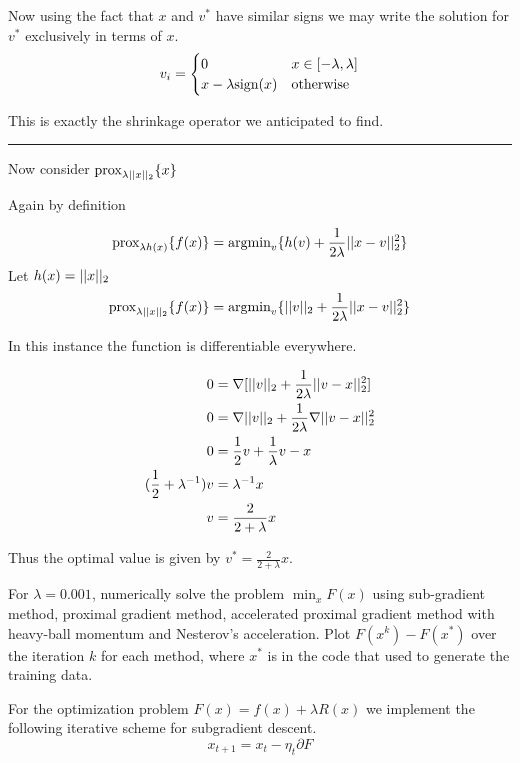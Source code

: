 \documentclass[11pt, answers]{exam}
\begin{document}
\begin{questions}
\begin{solution}
		Now using the fact that $x$ and $v^*$ have similar signs we may write the solution for $v^*$
		exclusively in terms of $x$.
		$$v_i = \begin{cases}0 & x\in [-\lambda, \lambda]\\
			x-\lambda\text{sign}(x) & \text{otherwise}
		\end{cases}$$

		This is exactly the shrinkage operator we anticipated to find.

		\vspace{.5in}\hrule\vspace{.5in}

		Now consider $\text{prox}_{\lambda|| x ||_2}\{x\}$

		Again by definition

		$$\text{prox}_{\lambda h(x)}\{f(x)\}=\text{argmin}_v\{h(v)+\frac{1}{2\lambda}|| x-v ||_2^2\}$$
		Let $h(x)=|| x ||_2$
		$$\text{prox}_{\lambda || x ||_2}\{f(x)\}=\text{argmin}_v\{|| v ||_2+\frac{1}{2\lambda}|| x-v ||_2^2\}$$

		In this instance the function is differentiable everywhere.

		\begin{align*}
		0&= \nabla [|| v ||_2 +\frac{1}{2\lambda}|| v-x ||_2^2]\\
		0&= \nabla || v ||_2 +\frac{1}{2\lambda}\nabla || v-x ||_2^2\\
		0&= \frac{1}{2}v+\frac{1}{\lambda}v-x\\
		(\frac{1}{2}+\lambda^{-1})v &= \lambda^{-1} x\\
		v &= \frac{2}{2+\lambda}x
		\end{align*}

		Thus the optimal value is given by $v^* = \frac{2}{2+\lambda}x$.

	\end{solution}
	
	\pagebreak
	
	\question For $\lambda=0.001$, numerically solve the problem $\min_xF(x)$ using sub-gradient method,
	proximal gradient method, accelerated proximal gradient method with heavy-ball momentum and Nesterov's
	acceleration.
	Plot $F(x^k)-F(x^*)$ over the iteration $k$ for each method,
	where $x^*$ is in the code that used to generate the training data.
	
	\begin{solution}
	
		For the optimization problem $F(x)=f(x)+\lambda R(x)$
		we implement the following iterative scheme for subgradient descent.
		$$ x_{t+1}=x_t -\eta_t\partial F$$
		

\end{solution}
\end{questions}
\end{document}
